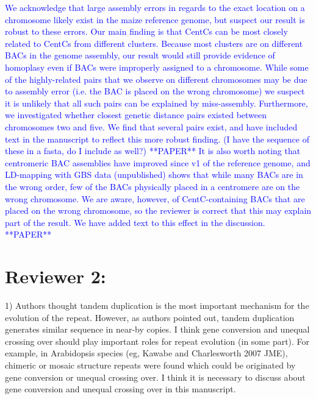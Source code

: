 \documentclass[]{article}
\newcommand{\res}[1]{\noindent \textcolor{blue}{{#1}} \\}
\begin{document}
\res{We acknowledge that large assembly errors in regards to the exact location on a chromosome likely exist in the maize reference genome, but suspect our result is robust to these errors.
Our main finding is that CentCs can be most closely related to CentCs from different clusters.
Because most clusters are on different BACs in the genome assembly, our result would still provide evidence of homoplasy even if BACs were improperly assigned to a chromosome. 
While some of the highly-related pairs that we observe on different chromosomes may be due to assembly error (i.e. the BAC is placed on the wrong chromosome) we suspect it is unlikely that all such pairs can be explained by miss-assembly.  
Furthermore, we investigated whether closest genetic distance pairs existed between chromosomes two and five.
We find that several pairs exist, and have included text in the manuscript to reflect this more robust finding. (I have the sequence of these in a fasta, do I include as well?) **PAPER**
It is also worth noting that centromeric BAC assemblies have improved since v1 of the reference genome, and LD-mapping with GBS data (unpublished) shows that while many BACs are in the wrong order, few of the BACs physically placed in a centromere are on the wrong chromosome. 
We are aware, however, of CentC-containing BACs that are placed on the wrong chromosome, so the reviewer is correct that this may explain part of the result.  
We have added text to this effect in the discussion. **PAPER**}

\section*{Reviewer 2:}

1) Authors thought tandem duplication is the most important mechanism for the evolution of the repeat. However, as authors pointed out, tandem duplication generates similar sequence in near-by copies. I think gene conversion and unequal crossing over should play important roles for repeat evolution (in some part). For example, in Arabidopsis species (eg, Kawabe and Charlesworth 2007 JME), chimeric or mosaic structure repeats were found which could be originated by gene conversion or unequal crossing over. I think it is necessary to discuss about gene conversion and unequal crossing over in this manuscript.\\
\end{document}
